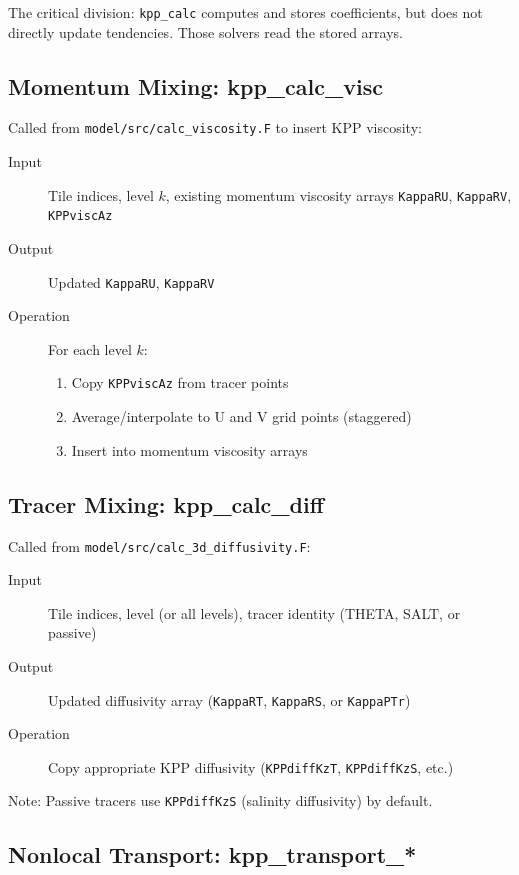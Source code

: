 \documentclass[11pt, a4paper]{article}
\begin{document}
The critical division: \texttt{kpp\_calc} computes and stores coefficients, but does not directly update tendencies. Those solvers read the stored arrays.

\subsection{Momentum Mixing: kpp\_calc\_visc}

Called from \texttt{model/src/calc\_viscosity.F} to insert KPP viscosity:

\begin{description}
    \item[Input] Tile indices, level $k$, existing momentum viscosity arrays \texttt{KappaRU}, \texttt{KappaRV}, \texttt{KPPviscAz}
    \item[Output] Updated \texttt{KappaRU}, \texttt{KappaRV}
    \item[Operation] For each level $k$:
    \begin{enumerate}
        \item Copy \texttt{KPPviscAz} from tracer points
        \item Average/interpolate to U and V grid points (staggered)
        \item Insert into momentum viscosity arrays
    \end{enumerate}
\end{description}

\subsection{Tracer Mixing: kpp\_calc\_diff}

Called from \texttt{model/src/calc\_3d\_diffusivity.F}:

\begin{description}
    \item[Input] Tile indices, level (or all levels), tracer identity (THETA, SALT, or passive)
    \item[Output] Updated diffusivity array (\texttt{KappaRT}, \texttt{KappaRS}, or \texttt{KappaPTr})
    \item[Operation] Copy appropriate KPP diffusivity (\texttt{KPPdiffKzT}, \texttt{KPPdiffKzS}, etc.)
\end{description}

Note: Passive tracers use \texttt{KPPdiffKzS} (salinity diffusivity) by default.

\subsection{Nonlocal Transport: kpp\_transport\_*}
\end{document}
